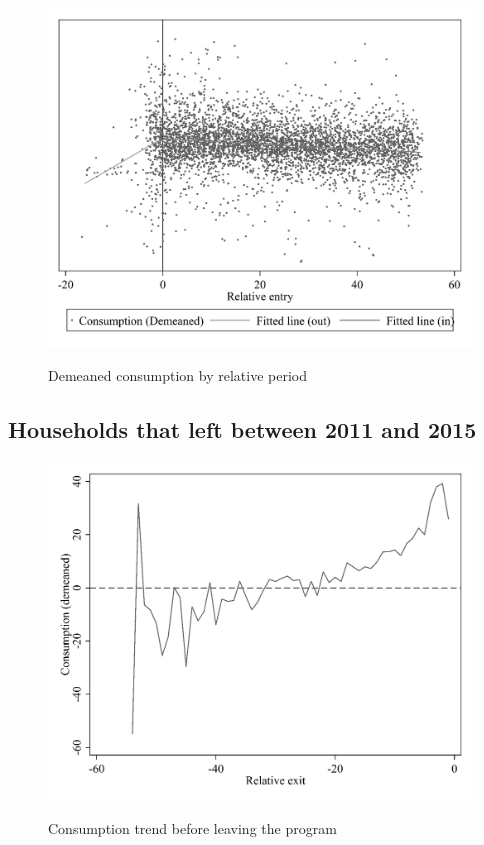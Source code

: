\FloatBarrier

\begin{figure}[ht]
  \caption{Demeaned consumption by relative period}\label{fig:eleven}
  \begin{center}
  {\includegraphics[width=1\textwidth]{./figures/image11.png}}
  \end{center}
\end{figure}

\FloatBarrier

\clearpage

\subsection{Households that left between 2011 and 2015}\label{appendix:C}

\begin{figure}[ht]
  \caption{Consumption trend before leaving the program}\label{fig:twelve}
  \begin{center}
  {\includegraphics[width=1\textwidth]{./figures/image12.png}}
  \end{center}
\end{figure}

